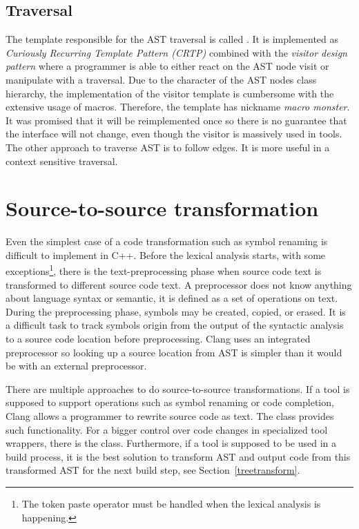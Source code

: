 \subsection{Traversal}
\label{clang-ast-traversal}
The template responsible for the AST traversal is called . It is implemented as \emph{Curiously Recurring Template Pattern (CRTP)} combined with the \emph{visitor design pattern} where a programmer is able to either react on the AST node visit or manipulate with a traversal. Due to the character of the AST nodes class hierarchy, the implementation of the visitor template is cumbersome with the extensive usage of macros. Therefore, the template has nickname \textit{macro monster}. It was promised that it will be reimplemented once so there is no guarantee that the interface will not change, even though the visitor is massively used in tools. The other approach to traverse AST is to follow edges. It is more useful in a context sensitive traversal.

\section{Source-to-source transformation}
Even the simplest case of a code transformation such as symbol renaming is difficult to implement in C++. Before the lexical analysis starts, with some exceptions\footnote{The token paste operator \code{\#\#} must be handled when the lexical analysis is happening.}, there is the text-preprocessing phase when source code text is transformed to different source code text. A preprocessor does not know anything about language syntax or semantic, it is defined as a set of operations on text. During the preprocessing phase, symbols may be created, copied, or erased. It is a difficult task to track symbols origin from the output of the syntactic analysis to a source code location before preprocessing. Clang uses an integrated preprocessor so looking up a source location from AST is simpler than it would be with an external preprocessor.

There are multiple approaches to do source-to-source transformations. If a tool is supposed to support operations such as symbol renaming or code completion, Clang allows a programmer to rewrite source code as text. The  class provides such functionality. For a bigger control over code changes in specialized tool wrappers, there is the  class. Furthermore, if a tool is supposed to be used in a build process, it is the best solution to transform AST and output code from this transformed AST for the next build step, see Section~\ref{treetransform}.

